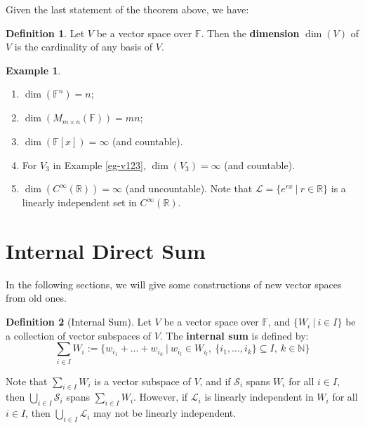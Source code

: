 \documentclass[11pt,openany]{book}
\theoremstyle{plain}
\theoremstyle{definition}
\newtheorem{definition}[definition]{Definition}
\newtheorem{example}[example]{Example}
\theoremstyle{remark}
\begin{document}
Given the last statement of the theorem above, we have:
\begin{definition}
    Let $V$ be a vector space over $\mathbb{F}$. Then the {\bf dimension} $\dim(V)$ of $V$ is the cardinality of any basis of $V$.
\end{definition}
\begin{example}
\begin{enumerate}
    \item $\dim(\mathbb{F}^n) = n$; 
    \item $\dim(M_{m \times n}(\mathbb{F})) = mn$;
    \item $\dim(\mathbb{F}[x]) = \infty$ (and countable).
    \item For $V_3$ in Example \ref{eg-v123}, $\dim(V_3) = \infty$ (and countable).
    \item $\dim(C^{\infty}(\mathbb{R})) = \infty$ (and uncountable). Note that $\mathcal{L} = \{e^{rx}\ |\ r \in \mathbb{R}\}$ is a linearly independent set in $C^{\infty}(\mathbb{R})$.
\end{enumerate}
\end{example}

\section{Internal Direct Sum}
In the following sections, we will give some constructions of new vector spaces from old ones.

\begin{definition}[Internal Sum]
    Let $V$ be a vector space over $\mathbb{F}$, and $\{W_i\ |\ i \in I\}$ be a collection of vector subspaces of $V$. The {\bf internal sum} is defined by:
    $$\sum_{i \in I} W_i := \{w_{i_1} + \dots + w_{i_k}\ |\ w_{i_l} \in W_{i_l},\ \{i_1, \dots, i_k\}\subseteq I,\ k \in \mathbb{N}\}$$
\end{definition}

Note that $\sum_{i \in I} W_i$ is a vector subspace of $V$, and if $\mathcal{S}_i$ spans $W_i$ for all $i \in I$, then $\bigcup_{i \in I} \mathcal{S}_i$ spans $\sum_{i \in I} W_i$. However, if $\mathcal{L}_i$ is linearly independent in $W_i$ for all $i \in I$, then $\bigcup_{i \in I} \mathcal{L}_i$ may not be linearly independent.
\end{document}
